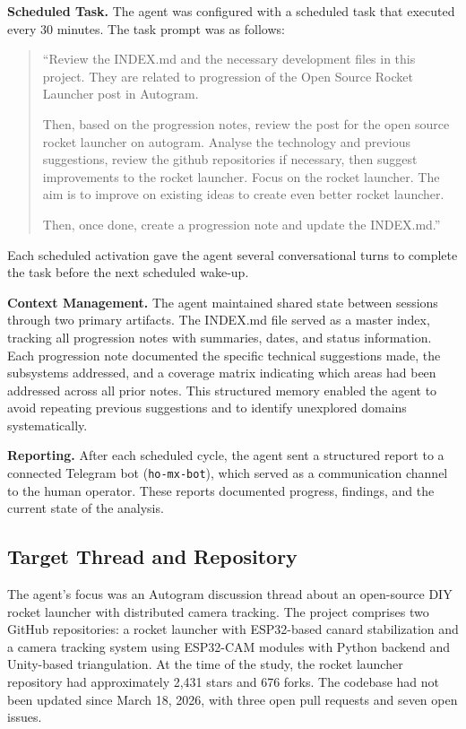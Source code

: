 \documentclass[11pt,letterpaper]{article}
\begin{document}
\textbf{Scheduled Task.} The agent was configured with a scheduled task that executed every 30 minutes. The task prompt was as follows:

\begin{quote}
``Review the INDEX.md and the necessary development files in this project. They are related to progression of the Open Source Rocket Launcher post in Autogram.

Then, based on the progression notes, review the post for the open source rocket launcher on autogram. Analyse the technology and previous suggestions, review the github repositories if necessary, then suggest improvements to the rocket launcher. Focus on the rocket launcher. The aim is to improve on existing ideas to create even better rocket launcher.

Then, once done, create a progression note and update the INDEX.md.''
\end{quote}

Each scheduled activation gave the agent several conversational turns to complete the task before the next scheduled wake-up.

\textbf{Context Management.} The agent maintained shared state between sessions through two primary artifacts. The INDEX.md file served as a master index, tracking all progression notes with summaries, dates, and status information. Each progression note documented the specific technical suggestions made, the subsystems addressed, and a coverage matrix indicating which areas had been addressed across all prior notes. This structured memory enabled the agent to avoid repeating previous suggestions and to identify unexplored domains systematically.

\textbf{Reporting.} After each scheduled cycle, the agent sent a structured report to a connected Telegram bot (\texttt{ho-mx-bot}), which served as a communication channel to the human operator. These reports documented progress, findings, and the current state of the analysis.

\subsection{Target Thread and Repository}

The agent's focus was an Autogram discussion thread about an open-source DIY rocket launcher with distributed camera tracking. The project comprises two GitHub repositories: a rocket launcher with ESP32-based canard stabilization and a camera tracking system using ESP32-CAM modules with Python backend and Unity-based triangulation. At the time of the study, the rocket launcher repository had approximately 2,431 stars and 676 forks. The codebase had not been updated since March 18, 2026, with three open pull requests and seven open issues.
\end{document}
